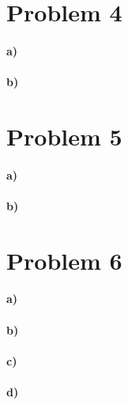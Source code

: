 \documentclass[12pt]{article}
\begin{document}
\section*{Problem 4}

\paragraph{a)}

\paragraph{b)}

\section*{Problem 5}

\paragraph{a)}

\paragraph{b)}

\section*{Problem 6}

\paragraph{a)}

\paragraph{b)}

\paragraph{c)}

\paragraph{d)}
\end{document}

